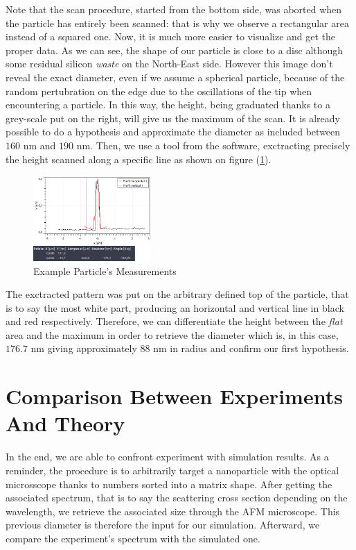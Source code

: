 \documentclass{article}
\numberwithin{equation}{section}
\begin{document}
Note that the scan procedure, started from the bottom side, was aborted when the particle has entirely been scanned: that is why we observe a rectangular area instead of a squared one. Now, it is much more easier to visualize and get the proper data. As we can see, the shape of our particle is close to a disc although some residual silicon \textit{waste} on the North-East side. However this image don't reveal the exact diameter, even if we assume a spherical particle, because of the random pertubration on the edge due to the oscillations of the tip when encountering a particle. In this way, the height, being graduated thanks to a grey-scale put on the right, will give us the maximum of the scan. It is already possible to do a hypothesis and approximate the diameter as included between $160$ nm and $190$ nm. Then, we use a tool from the software, exctracting precisely the height scanned along a specific line as shown on figure (\ref{fig:gwyddion_mesure_ex}).
\begin{figure}[h!]
    \centering
    \includegraphics[width=0.4\textwidth, height=0.32\textwidth]{gwyddion_mesure_ex.png}
    \caption{Example Particle's Measurements}
    \label{fig:gwyddion_mesure_ex}
\end{figure}
The exctracted pattern was put on the arbitrary defined top of the particle, that is to say the most white part, producing an horizontal and vertical line in black and red respectively. Therefore, we can differentiate the height between the \textit{flat} area and the maximum in order to retrieve the diameter which is, in this case, $176.7$ nm giving approximately $88$ nm in radius and confirm our first hypothesis.

\section{Comparison Between Experiments And Theory}

In the end, we are able to confront experiment with simulation results. As a reminder, the procedure is to arbitrarily target a nanoparticle with the optical microsscope thanks to numbers sorted into a matrix shape. After getting the associated spectrum, that is to say the scattering cross section depending on the wavelength, we retrieve the associated size through the AFM microscope. This previous diameter is therefore the input for our simulation. Afterward, we compare the experiment's spectrum with the simulated one.
\end{document}
